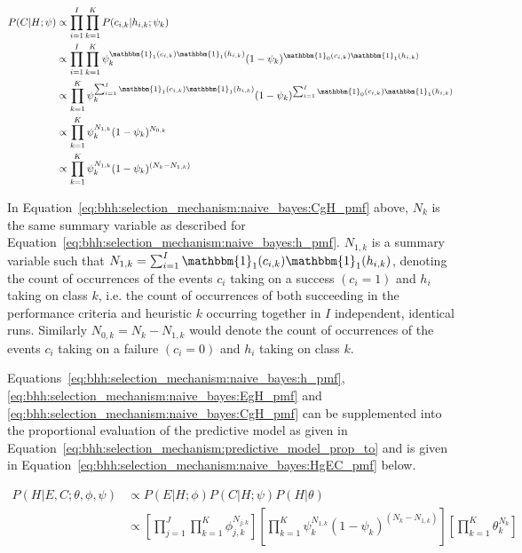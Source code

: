 \begin{equation}
      \label{eq:bhh:selection_mechanism:naive_bayes:CgH_pmf}
      \begin{split}
            P(C\vert H;  \psi)
            &\propto\prod_{i=1}^{I} \prod_{k=1}^{K} P(c_{i,k} \vert h_{i,k} ; \psi_{k})  \\
            &\propto \prod_{i=1}^{I} \prod_{k=1}^{K} \psi_{k}^{\mathbbm{1}_{1}(c_{i,k})\mathbbm{1}_{1}(h_{i,k})} (1 - \psi_{k})^{\mathbbm{1}_{0}(c_{i,k})\mathbbm{1}_{1}(h_{i,k})}\\
            &\propto \prod_{k=1}^{K} \psi_{k}^{\sum_{i=1}^{I} \mathbbm{1}_{1}(c_{i,k})\mathbbm{1}_{1}(h_{i,k})} (1 - \psi_{k})^{\sum_{i=1}^{I} \mathbbm{1}_{0}(c_{i,k})\mathbbm{1}_{1}(h_{i,k})}\\
            &\propto \prod_{k=1}^{K} \psi_{k}^{N_{1,k}} (1 - \psi_{k})^{N_{0,k}} \\
            &\propto \prod_{k=1}^{K} \psi_{k}^{N_{1,k}} (1 - \psi_{k})^{(N_{k} - N_{1,k})}
      \end{split}
\end{equation}

In Equation~\eqref{eq:bhh:selection_mechanism:naive_bayes:CgH_pmf} above, $N_{k}$ is the same summary variable as described for Equation~\eqref{eq:bhh:selection_mechanism:naive_bayes:h_pmf}. $N_{1,k}$ is a summary variable such that $N_{1,k} = \sum_{i=1}^{I} \mathbbm{1}_{1}(c_{i,k})\mathbbm{1}_{1}(h_{i,k})$, denoting the count of occurrences of the events $c_{i}$ taking on a success $(c_{i}=1)$ and $h_{i}$ taking on class $k$, i.e. the count of occurrences of both succeeding in the performance criteria and heuristic $k$ occurring together in $I$ independent, identical runs. Similarly $N_{0,k} = N_{k} - N_{1,k}$ would denote the count of occurrences of the events $c_{i}$ taking on a failure $(c_{i}=0)$ and $h_{i}$
taking on class $k$.

Equations~\eqref{eq:bhh:selection_mechanism:naive_bayes:h_pmf}, \eqref{eq:bhh:selection_mechanism:naive_bayes:EgH_pmf} and \eqref{eq:bhh:selection_mechanism:naive_bayes:CgH_pmf} can be supplemented into the proportional evaluation of the predictive model as given in Equation~\eqref{eq:bhh:selection_mechanism:predictive_model_prop_to} and is given in Equation~\eqref{eq:bhh:selection_mechanism:naive_bayes:HgEC_pmf} below.

\begin{equation}
      \label{eq:bhh:selection_mechanism:naive_bayes:HgEC_pmf}
      \begin{split}
            P(H \vert E, C;  \theta, \phi, \psi)
            &\propto P(E \vert H;  \phi)  P(C \vert H;  \psi) P(H \vert \theta)  \\
            &\propto \left[ \prod_{j=1}^{J} \prod_{k=1}^{K} \phi_{j,k}^{N_{j,k}} \right] \left[ \prod_{k=1}^{K} \psi_{k}^{N_{1,k}} (1 - \psi_{k})^{(N_{k} - N_{1,k})} \right] \left[ \prod_{k=1}^{K} \theta_{k}^{N_{k}} \right]
      \end{split}
\end{equation}

